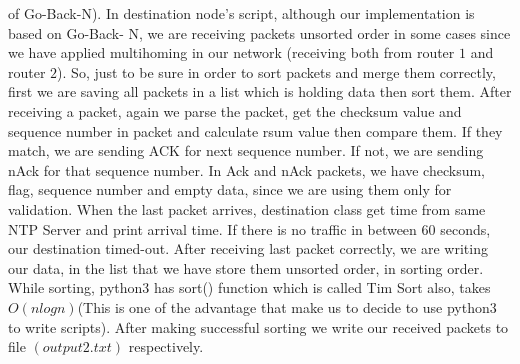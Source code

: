 of Go-Back-N). In destination node's script, although our implementation is based on Go-Back- N, we are receiving packets unsorted order in some cases since we have applied multihoming in our network (receiving both from router $1$ and router $2$). So, just to be sure in order to sort packets and merge them correctly, first we are saving all packets in a list which is holding data then sort them. After receiving a packet, again we parse the packet, get the checksum value and sequence number in packet and calculate rsum value then compare them. If they match, we are sending ACK for next sequence number. If not, we are sending nAck for that sequence number. In Ack and nAck packets, we have checksum, flag, sequence number and empty data, since we are using them only for validation. When the last packet arrives, destination class get time from same NTP Server and print arrival time. If there is no traffic in between $60$ seconds, our destination timed-out. After receiving last packet correctly, we are writing our data, in the list that we have store them unsorted order, in sorting order. While sorting, python3 has sort() function which is called Tim Sort also, takes $O(n log n)$(This is one of the advantage that make us to decide to use python3 to write scripts). After making successful sorting we write our received packets to file $(output2.txt)$ respectively.